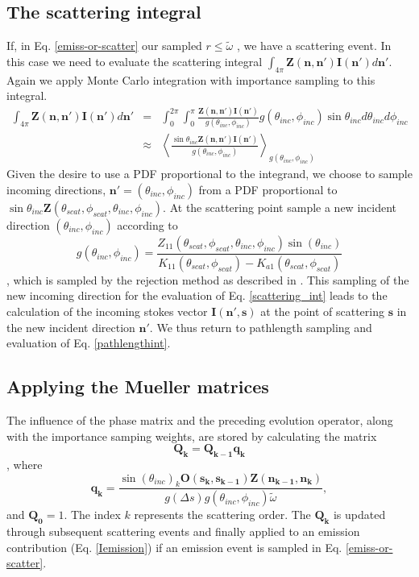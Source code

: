 \subsection {The scattering integral}

If, in Eq. \ref{emiss-or-scatter} our sampled $r\le\tilde{\omega}$
, we have a scattering event.  In this case we need to evaluate the scattering
integral $\int_{4\pi}\mathbf{Z(n,n')}\mathbf{I(n')}d\mathbf{n'}$.
Again we apply Monte Carlo integration with importance sampling to
this integral.
\begin{eqnarray}
\int_{4\pi}\mathbf{Z(n,n')}\mathbf{I(n')}d\mathbf{n'}&=&\int_0^{2\pi}\int_0^\pi\frac{\mathbf{Z(n,n')}\mathbf{I(n')}}{g(\theta_{inc},\phi_{inc})}g(\theta_{inc},\phi_{inc})\sin{\theta_{inc}}d\theta_{inc}d\phi_{inc}\\
&\approx&\left\langle\frac{\sin{\theta_{inc}}\mathbf{Z(n,n')}\mathbf{I(n')}}{g(\theta_{inc},\phi_{inc})}\right\rangle_{g(\theta_{inc},\phi_{inc})}
\label{scattering_int}
\end{eqnarray}
Given the desire to use a PDF proportional to the integrand, we
choose to sample incoming directions,
$\mathbf{n'}=(\theta_{inc},\phi_{inc})$ from a PDF proportional
to $\sin{\theta_{inc}}\mathbf{Z}(\theta_{scat},\phi_{scat},\theta_{inc},\phi_{inc})$.
At the scattering point sample a new incident direction
  $(\theta_{inc},\phi_{inc})$ according to 
\begin{equation}
g(\theta_{inc},\phi_{inc})=\frac{Z_{11}(\theta_{scat},\phi_{scat},
\theta_{inc},\phi_{inc})\sin(\theta_{inc})}{K_{11}(\theta_{scat},\phi_{scat})
  - K_{a1}(\theta_{scat},\phi_{scat})}
\label{gdir}
\end{equation}
, which is
sampled by the rejection method as described in \cite{liu:01}.  This sampling of the new incoming direction for the evaluation of Eq. \ref{scattering_int} leads to the calculation of the incoming stokes vector $\mathbf{I(n',s)}$ at the point of scattering $\mathbf{s}$ in the new incident direction $\mathbf{n'}$. We thus return to pathlength sampling and evaluation of Eq. \ref{pathlengthint}.  

\subsection{Applying the Mueller matrices}

The influence of the phase matrix and the preceding evolution operator, along with the importance samping weights, are stored by calculating the matrix
\begin{equation}
\mathbf{Q_k}=\mathbf{Q_{k-1}q_k}
\label{Q}
\end{equation}
, where
\begin{equation}
\mathbf{q_k}=\frac{\sin(\theta_{inc})_k
  \mathbf{O(s_k,s_{k-1})}\mathbf{Z(n_{k-1},n_k)}}
  {g\left(\Delta s\right)g(\theta_{inc},\phi_{inc}) \tilde{\omega}} ,
\label{q}
\end{equation}
and $\mathbf{Q_0}={1}$. The index $k$ represents the
scattering order.  The $\mathbf{Q_k}$ is updated through subsequent scattering events and finally applied to an emission contribution (Eq. \ref{Iemission}) if an emission event is sampled in Eq. \ref{emiss-or-scatter}.  

